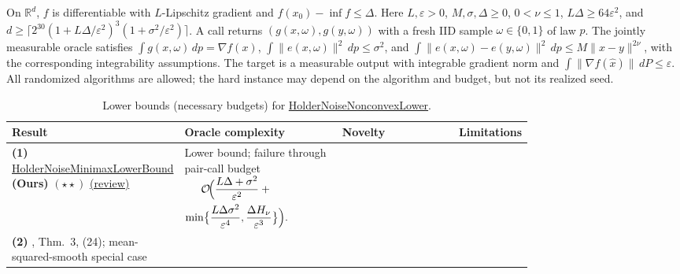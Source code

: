 \begin{table}[tp]
\centering
\caption{Lower bounds (necessary budgets) for \href{https://github.com/k3nfalt/longtails/blob/main/LongTails/Setups/HolderNoiseNonconvexLower.lean}{HolderNoiseNonconvexLower}.}\label{tab:HolderNoiseNonconvexLower}
\parbox{\linewidth}{\footnotesize On $\mathbb R^d$, $f$ is differentiable with $L$-Lipschitz gradient and $f(x_0)-\inf f\le\Delta$. Here $L,\varepsilon>0$, $M,\sigma,\Delta\ge0$, $0<\nu\le1$, $L\Delta\ge64\varepsilon^2$, and $d\ge\lceil2^{30}(1+L\Delta/\varepsilon^2)^3(1+\sigma^2/\varepsilon^2)\rceil$. A call returns $(g(x,\omega),g(y,\omega))$ with a fresh IID sample $\omega\in\{0,1\}$ of law $p$. The jointly measurable oracle satisfies $\int g(x,\omega)\,dp=\nabla f(x)$, $\int\|e(x,\omega)\|^2\,dp\le\sigma^2$, and $\int\|e(x,\omega)-e(y,\omega)\|^2\,dp\le M\|x-y\|^{2\nu}$, with the corresponding integrability assumptions. The target is a measurable output with integrable gradient norm and $\int\|\nabla f(\widehat x)\|\,dP\le\varepsilon$. All randomized algorithms are allowed; the hard instance may depend on the algorithm and budget, but not its realized seed.}\par\smallskip
\begin{threeparttable}
\footnotesize
\setlength{\tabcolsep}{4pt}\renewcommand{\arraystretch}{1.25}
\begin{tabularx}{\linewidth}{@{}>{\raggedright\arraybackslash}p{0.20\linewidth}>{\raggedright\arraybackslash}p{0.32\linewidth}>{\raggedright\arraybackslash}p{0.25\linewidth}>{\raggedright\arraybackslash}X@{}}
\toprule
\textbf{Result} & \textbf{Oracle complexity} & \textbf{Novelty} & \textbf{Limitations} \\
\midrule
\textbf{(1)} \href{https://github.com/k3nfalt/longtails/blob/main/LongTails/Theorems/HolderNoiseMinimaxLowerBound.lean}{Holder\allowbreak Noise\allowbreak Minimax\allowbreak Lower\allowbreak Bound} \textbf{(Ours)} $(\star\star)$ \href{https://github.com/k3nfalt/longtails/blob/main/scripts/reviews/HolderNoiseMinimaxLowerBound.md}{(review)}
& Lower bound; failure through pair-call budget
$\begin{gathered}\mathcal{O}\!\Bigl(\frac{L\Delta+\sigma^2}{\varepsilon^2}+{}\\
\min\bigl\{\frac{L\Delta\sigma^2}{\varepsilon^4},\frac{\Delta H_\nu}{\varepsilon^3}\bigr\}\Bigr).
\end{gathered}$
& & \\
\midrule[1.2pt]
\textbf{(2)} \citep{hnnlArjevani2023V2}, Thm.~3, (24); mean-squared-smooth special case

\end{tabularx}
\end{threeparttable}
\end{table}
